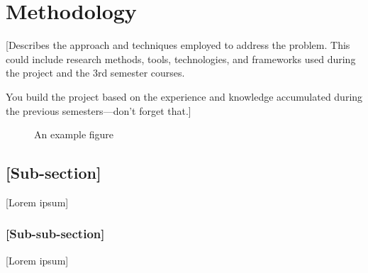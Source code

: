 \chapter{Methodology}
\label{chap:methodology}

[Describes the approach and techniques employed to address the problem. This could include research methods, tools, technologies, and frameworks used during the project and the 3rd semester courses.

You build the project based on the experience and knowledge accumulated during the previous semesters---don't forget that.]

\begin{figure}[htbp]
    \centering
    \caption{An example figure}
    \label{fig:example_figure}
\end{figure}

\section{[Sub-section]}
\label{sec:methodology_subsection}
[Lorem ipsum]

\subsection{[Sub-sub-section]}
\label{subsec:methodology_subsubsection}
[Lorem ipsum]

